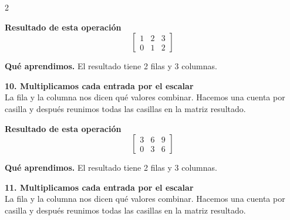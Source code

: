 \documentclass[11pt,a4paper,landscape]{article}
\begin{document}
\begin{multicols*}{2}
\begin{minipage}{\linewidth}
\par\smallskip \textbf{Resultado de esta operación}\[\begin{bmatrix}1 & 2 & 3\\0 & 1 & 2\end{bmatrix}\]
\par\smallskip\textbf{Qué aprendimos.} El resultado tiene 2 filas y 3 columnas.
\end{minipage}\par\medskip
\noindent\begin{minipage}{\linewidth}\textbf{10. Multiplicamos cada entrada por el escalar}\\[2pt]La fila y la columna nos dicen qué valores combinar. Hacemos una cuenta por casilla y después reunimos todas las casillas en la matriz resultado.
\par{}\par\smallskip
\par\smallskip \textbf{Resultado de esta operación}\[\begin{bmatrix}3 & 6 & 9\\0 & 3 & 6\end{bmatrix}\]
\par\smallskip\textbf{Qué aprendimos.} El resultado tiene 2 filas y 3 columnas.
\end{minipage}\par\medskip
\noindent\begin{minipage}{\linewidth}\textbf{11. Multiplicamos cada entrada por el escalar}\\[2pt]La fila y la columna nos dicen qué valores combinar. Hacemos una cuenta por casilla y después reunimos todas las casillas en la matriz resultado.

\end{minipage}
\end{multicols*}
\end{document}
